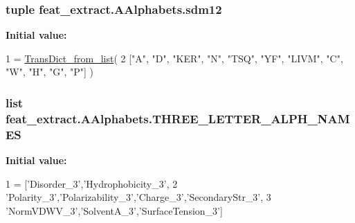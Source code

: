\subsubsection[{sdm12}]{\setlength{\rightskip}{0pt plus 5cm}tuple feat\+\_\+extract.\+A\+Alphabets.\+sdm12}\label{namespacefeat__extract_1_1_a_alphabets_aca4608a7d25630074f6e1a0750c7a2c8}
{\bfseries Initial value\+:}
\begin{DoxyCode}
1 = \hyperlink{namespacefeat__extract_1_1_a_alphabets_acdda8523b57175e0e79064c4da723c5d}{TransDict\_from\_list}(
2     [\textcolor{stringliteral}{"A"}, \textcolor{stringliteral}{"D"}, \textcolor{stringliteral}{"KER"}, \textcolor{stringliteral}{"N"},  \textcolor{stringliteral}{"TSQ"}, \textcolor{stringliteral}{"YF"}, \textcolor{stringliteral}{"LIVM"}, \textcolor{stringliteral}{"C"}, \textcolor{stringliteral}{"W"}, \textcolor{stringliteral}{"H"}, \textcolor{stringliteral}{"G"}, \textcolor{stringliteral}{"P"}] )
\end{DoxyCode}
\hypertarget{namespacefeat__extract_1_1_a_alphabets_abf414b9aa0f6e1d026d1c22ccad73c93}{}
\subsubsection[{T\+H\+R\+E\+E\+\_\+\+L\+E\+T\+T\+E\+R\+\_\+\+A\+L\+P\+H\+\_\+\+N\+A\+M\+E\+S}]{\setlength{\rightskip}{0pt plus 5cm}list feat\+\_\+extract.\+A\+Alphabets.\+T\+H\+R\+E\+E\+\_\+\+L\+E\+T\+T\+E\+R\+\_\+\+A\+L\+P\+H\+\_\+\+N\+A\+M\+E\+S}\label{namespacefeat__extract_1_1_a_alphabets_abf414b9aa0f6e1d026d1c22ccad73c93}
{\bfseries Initial value\+:}
\begin{DoxyCode}
1 = [\textcolor{stringliteral}{'Disorder\_3'},\textcolor{stringliteral}{'Hydrophobicity\_3'},
2 \textcolor{stringliteral}{'Polarity\_3'},\textcolor{stringliteral}{'Polarizability\_3'},\textcolor{stringliteral}{'Charge\_3'},\textcolor{stringliteral}{'SecondaryStr\_3'},
3 \textcolor{stringliteral}{'NormVDWV\_3'},\textcolor{stringliteral}{'SolventA\_3'},\textcolor{stringliteral}{'SurfaceTension\_3'}]
\end{DoxyCode}
